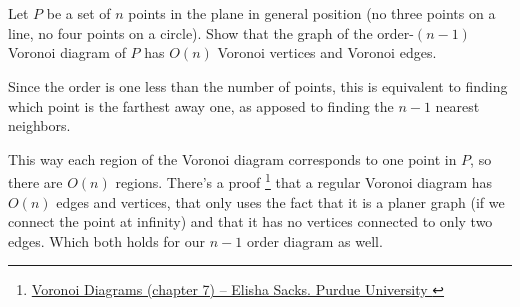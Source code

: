 \documentclass{article}
\begin{document}
  \section{}
  \begin{centerframebox}
    Let $P$ be a set of $n$ points in the plane in general position (no three points on a line, no four
    points on a circle). Show that the graph of the order-$(n - 1)$ Voronoi diagram of $P$ has $O(n)$
    Voronoi vertices and Voronoi edges.
  \end{centerframebox}
  Since the order is one less than the number of points,
  this is equivalent to finding which point is the farthest away one,
  as apposed to finding the $n-1$ nearest neighbors.

  This way each region of the Voronoi diagram corresponds to one point in $P$, so there are $O(n)$ regions.
  There's a proof%
  \footnote{\href{https://www.cs.purdue.edu/homes/cs53100/slides/voronoi.pdf\#Navigation7}{
    Voronoi Diagrams (chapter 7) -- Elisha Sacks. Purdue University
  }}
  that a regular Voronoi diagram has $O(n)$ edges and vertices,
  that only uses the fact that it is a planer graph (if we connect the point at infinity)
  and that it has no vertices connected to only two edges.
  Which both holds for our $n-1$ order diagram as well.
\end{document}
